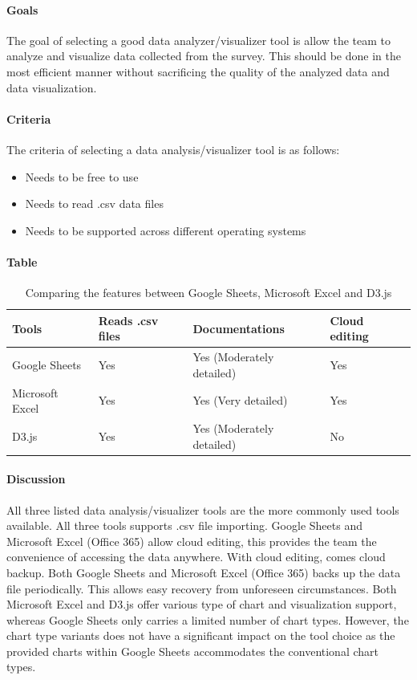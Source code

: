 \paragraph{Goals}
The goal of selecting a good data analyzer/visualizer tool is allow the team to analyze and visualize data collected from the survey.
This should be done in the most efficient manner without sacrificing the quality of the analyzed data and data visualization.

\paragraph{Criteria}
The criteria of selecting a data analysis/visualizer tool is as follows:
\begin{itemize}
\item Needs to be free to use
\item Needs to read .csv data files
\item Needs to be supported across different operating systems
\end{itemize}

\paragraph{Table}
\begin{center}
\begin{table}[H]
\begin{tabular}{ | m{10em} | m{15em} | m{15em} | m{15em} |  } 
\hline
\textbf{Tools}  & \textbf{Reads .csv files } & \textbf{Documentations} & \textbf{Cloud editing} \\ \hline
Google Sheets & Yes  & Yes (Moderately detailed) & Yes \\ \hline
Microsoft Excel & Yes & Yes (Very detailed) & Yes \\ \hline
D3.js & Yes & Yes (Moderately detailed) & No \\ \hline 
\end{tabular}
\newline
\caption{Comparing the features between Google Sheets, Microsoft Excel and D3.js}
\label{table:datatools}
\end{table}
\end{center}

\newpage

\paragraph{Discussion}
All three listed data analysis/visualizer tools are the more commonly used tools available.
All three tools supports .csv file importing.
Google Sheets and Microsoft Excel (Office 365) allow cloud editing, this provides the team the convenience of accessing the data anywhere.
With cloud editing, comes cloud backup.
Both Google Sheets and Microsoft Excel (Office 365) backs up the data file periodically.
This allows easy recovery from unforeseen circumstances.
Both Microsoft Excel and D3.js offer various type of chart and visualization support, whereas Google Sheets only carries a limited number of chart types.
However, the chart type variants does not have a significant impact on the tool choice as the provided charts within Google Sheets accommodates the conventional chart types.

